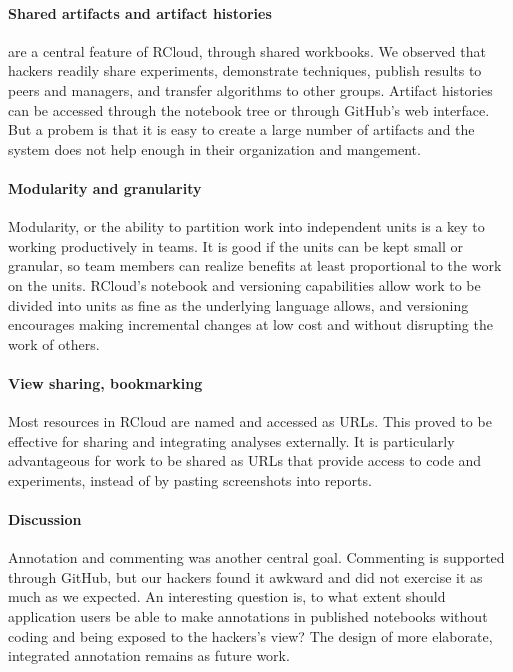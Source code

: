 \paragraph*{Shared artifacts and artifact histories} are a central feature
of RCloud, through shared workbooks. We observed that hackers readily
share experiments, demonstrate techniques, publish results to peers and
managers, and transfer algorithms to other groups. Artifact histories
can be accessed through the notebook tree or through GitHub's web interface.
But a probem is that it is easy to create a large number of artifacts
and the system does not help enough in their organization and mangement.

\paragraph*{Modularity and granularity} Modularity, or the ability
to partition work into independent units is a key to working
productively in teams.
It is good if the units can be kept small or granular, so team members can
realize benefits at least proportional to the work on the units.
RCloud's notebook and versioning capabilities allow work to be divided
into units as fine as the underlying language allows, and versioning
encourages making incremental changes at low cost and without disrupting
the work of others.

\paragraph*{View sharing, bookmarking} Most resources in RCloud are named
and accessed as URLs. This proved to be effective for sharing and integrating
analyses externally. It is particularly advantageous for work to be shared
as URLs that provide access to code and experiments, instead of by pasting
screenshots into reports.

\paragraph*{Discussion} Annotation and commenting was another central goal.
Commenting is supported through GitHub, but our hackers found it
awkward and did not exercise it as much as we expected.
An interesting question is, to what extent should application users
be able to make annotations in published notebooks without coding
and being exposed to the hackers's view? The design of
more elaborate, integrated annotation remains as future work.

